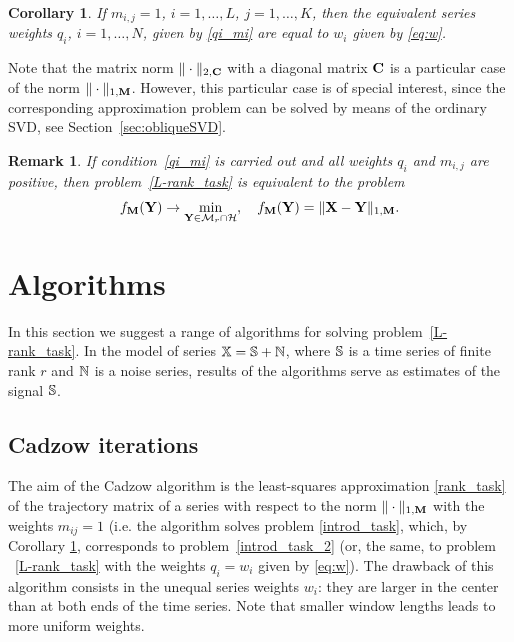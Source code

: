 \documentclass[sii]{ipart}
\newtheorem{corollary}{Corollary}
\newtheorem{remark}{Remark}
\begin{document}
\begin{corollary}
	\label{cor:base_weights}
	If $m_{i,j}=1$, $i =1, \ldots, L$, $j = 1, \ldots, K$, then the equivalent series weights $q_i$, $i = 1, \ldots, N$, given by \eqref{qi_mi} are equal to $w_i$ given by \eqref{eq:w}.
\end{corollary}

Note that the matrix norm $\|\cdot\|_{2, \mathbf{C}}$ with a diagonal matrix $\mathbf{C}$ is a particular case of the norm $\|\cdot\|_{1, \mathbf{M}}$. 
However, this particular case is of special interest, since the corresponding approximation problem can be solved by means of the ordinary SVD, see Section~\ref{sec:obliqueSVD}.

\begin{remark}
	\label{rem:2tasks}
	If condition~\eqref{qi_mi} is carried out and all weights $q_i$ and $m_{i,j}$ are positive, then problem~\eqref{L-rank_task}
	is equivalent to the problem
	\begin{equation}
	\label{rank_task}
	f_\bfM(\bfY) \to \min_{\bfY \in \calM_r \cap \calH}, \quad f_\bfM(\bfY) = \|\bfX-\bfY\|_{1,\bfM}.
	\end{equation}
\end{remark}

\section{Algorithms}
\label{sec:alg}
In this section we suggest a range of algorithms for solving problem~\eqref{L-rank_task}.
In the model of series $\mathbb{X}=\mathbb{S}+\mathbb{N}$, where $\mathbb{S}$ is a time series of finite rank $r$ and $\mathbb{N}$ is a noise series, results of the algorithms serve as  estimates of the signal $\mathbb{S}$.

\subsection{Cadzow iterations}
The aim of the Cadzow algorithm \cite{Cadzow1988} is the least-squares approximation \eqref{rank_task} of the trajectory matrix of a series with respect to the norm $\|\cdot\|_{1, \mathbf{M}}$ with the weights $m_{ij}=1$ (i.e. the algorithm solves problem \eqref{introd_task}, which, by Corollary \ref{cor:base_weights}, corresponds to problem~\eqref{introd_task_2} (or, the same, to problem ~\eqref{L-rank_task} with the weights $q_i=w_i$ given by \eqref{eq:w}). The drawback of this algorithm consists in the unequal series weights $w_i$: they are larger in the center than at both ends of the time series. Note that smaller window lengths leads to more uniform weights.
\end{document}

